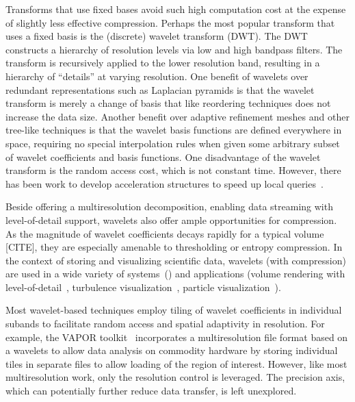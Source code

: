 Transforms that use fixed bases avoid such high computation cost at the expense of slightly less
effective compression. Perhaps the most popular transform that uses a fixed basis is the (discrete)
wavelet transform (DWT). The DWT constructs a hierarchy of resolution levels via low and high
bandpass filters. The transform is recursively applied to the lower resolution band, resulting in a
hierarchy of ``details'' at varying resolution. One benefit of wavelets over redundant
representations such as Laplacian pyramids is that the wavelet transform is merely a change of basis
that like reordering techniques does not increase the data size. Another benefit over adaptive
refinement meshes and other tree-like techniques is that the wavelet basis functions are defined
everywhere in space, requiring no special interpolation rules when given some arbitrary subset of
wavelet coefficients and basis functions. One disadvantage of the wavelet transform is the random
access cost, which is not constant time. However, there has been work to develop acceleration
structures to speed up local queries~\cite{weiss}.

Beside offering a multiresolution decomposition, enabling data streaming with level-of-detail
support, wavelets also offer ample opportunities for compression. As the magnitude of wavelet
coefficients decays rapidly for a typical volume [CITE], they are especially amenable to thresholding
or entropy compression. In the context of storing and visualizing scientific data, wavelets (with
compression) are used in a wide variety of
systems~(\cite{multires_toolkit2003,vapor2007,woodring2011}) and applications (volume rendering
with
level-of-detail~\cite{wavelet-compression-interactive-vis,multires-framework,rapid-compression-volume,interactive-rendering-large-volume,multires-volume-rendering},
turbulence visualization~\cite{treib}, particle visualization~\cite{sph-octree}).

Most wavelet-based techniques employ tiling of wavelet coefficients in individual subands to
facilitate random access and spatial adaptivity in resolution. For example, the VAPOR
toolkit~\cite{vapor2007} incorporates a multiresolution file format based on a wavelets to allow
data analysis on commodity hardware by storing individual tiles in separate files to allow loading
of the region of interest. However, like most multiresolution work, only the resolution control is
leveraged. The precision axis, which can potentially further reduce data transfer, is left
unexplored.

